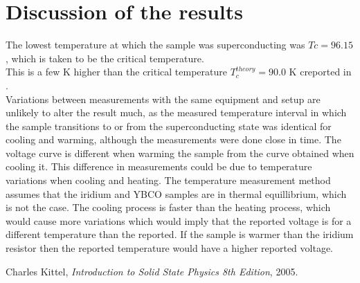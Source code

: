 \documentclass[a4paper,twoside=false,abstract=false,numbers=noenddot,
titlepage=false,headings=small,parskip=half,version=last]{scrartcl}
\begin{document}
\section{Discussion of the results}
The lowest temperature at which the sample was superconducting was $Tc = 96.15$, which is taken to be the critical temperature.\\
This is a few K higher than the critical temperature $T_c^{theory}=90.0$ K creported in \cite{Kittel}.\\
Variations between measurements with the same equipment and setup are unlikely to alter the result much, as the measured temperature interval in which the sample transitions to or from the superconducting state was identical for cooling and warming, although the measurements were done close in time.
The voltage curve is different when warming the sample from the curve obtained when cooling it.
This difference in measurements could be due to temperature variations when cooling and heating.
The temperature measurement method assumes that the iridium and YBCO samples are in thermal equillibrium, which is not the case.
The cooling process is faster than the heating process, which would cause more variations which would imply that the reported voltage is for a different temperature than the reported.
If the sample is warmer than the iridium resistor then the reported temperature would have a higher reported voltage.

\begin{thebibliography}{1}
        Charles Kittel,
        {\em Introduction to Solid State Physics 8th Edition},
        2005.
\end{thebibliography}
\end{document}
